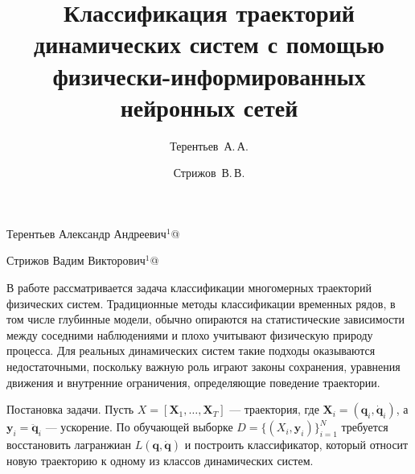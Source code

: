 \documentclass[twoside]{article}
\begin{document}
\Russian
\title{Классификация траекторий динамических систем с помощью физически-информированных нейронных сетей}
\author{Терентьев~А.\,А.}{Терентьев Александр Андреевич$^{1}$\speaker}{@}
\author{Стрижов~В.\,В.}{Стрижов Вадим Викторович$^{1}$}{@}
\maketitle

В работе рассматривается задача классификации многомерных траекторий физических систем. Традиционные методы классификации временных рядов, в том числе глубинные модели, обычно опираются на статистические зависимости между соседними наблюдениями и плохо учитывают физическую природу процесса. Для реальных динамических систем такие подходы оказываются недостаточными, поскольку важную роль играют законы сохранения, уравнения движения и внутренние ограничения, определяющие поведение траектории.

Постановка задачи. Пусть $X=[\mathbf X_1,\dots,\mathbf X_T]$ --- траектория, где $\mathbf X_i=(\mathbf q_i,\dot{\mathbf q}_i)$, а $\mathbf y_i=\ddot{\mathbf q}_i$ --- ускорение. По обучающей выборке $D=\{(X_i,\mathbf y_i)\}_{i=1}^N$ требуется восстановить лагранжиан $L(\mathbf q,\dot{\mathbf q})$ и построить классификатор, который относит новую траекторию к одному из классов динамических систем.
\end{document}
